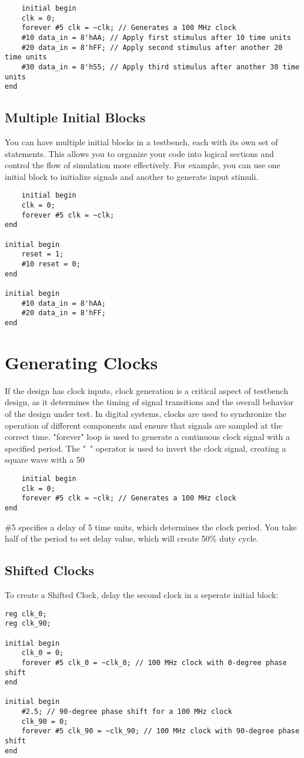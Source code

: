 \documentclass{report}
\begin{document}
\begin{verbatim}
    initial begin
    clk = 0;
    forever #5 clk = ~clk; // Generates a 100 MHz clock
    #10 data_in = 8'hAA; // Apply first stimulus after 10 time units
    #20 data_in = 8'hFF; // Apply second stimulus after another 20 time units
    #30 data_in = 8'h55; // Apply third stimulus after another 30 time units
end
\end{verbatim}

\subsection{Multiple Initial Blocks}
You can have multiple initial blocks in a testbench, each with its own set of statements. This allows you to organize your code into logical sections and control the flow of simulation more effectively. For example, you can use one initial block to initialize signals and another to generate input stimuli.
\begin{verbatim}
    initial begin
    clk = 0;
    forever #5 clk = ~clk;
end

initial begin
    reset = 1;
    #10 reset = 0;
end

initial begin
    #10 data_in = 8'hAA;
    #20 data_in = 8'hFF;
end
\end{verbatim}

\section{Generating Clocks}
If the design has clock inputs, clock generation is a critical aspect of testbench design, as it determines the timing of signal transitions and the overall behavior of the design under test. In digital systems, clocks are used to synchronize the operation of different components and ensure that signals are sampled at the correct time.
"forever" loop is used to generate a continuous clock signal with a specified period. The "~" operator is used to invert the clock signal, creating a square wave with a 50%
\begin{verbatim}
    initial begin
    clk = 0;
    forever #5 clk = ~clk; // Generates a 100 MHz clock
end
\end{verbatim}
\#5 specifies a delay of 5 time units, which determines the clock period. You take half of the period to set delay value, which will create 50\% duty cycle.
\subsection{Shifted Clocks}
To create a Shifted Clock, delay the second clock in a seperate initial block:
\begin{verbatim}
reg clk_0;
reg clk_90;

initial begin
    clk_0 = 0;
    forever #5 clk_0 = ~clk_0; // 100 MHz clock with 0-degree phase shift
end

initial begin
    #2.5; // 90-degree phase shift for a 100 MHz clock
    clk_90 = 0;
    forever #5 clk_90 = ~clk_90; // 100 MHz clock with 90-degree phase shift
end
\end{verbatim}
\end{document}
